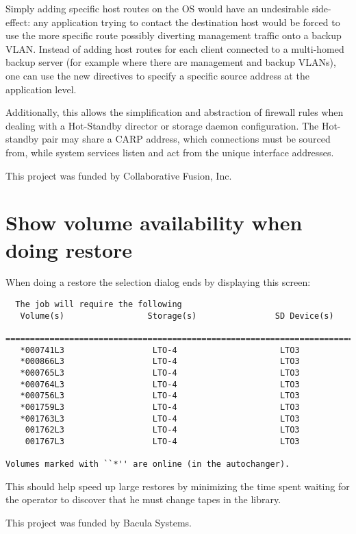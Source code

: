 Simply adding specific host routes on the OS
would have an undesirable side-effect: any
application trying to contact the destination host would be forced to use the
more specific route possibly diverting management traffic onto a backup VLAN.
Instead of adding host routes for each client connected to a multi-homed backup
server (for example where there are management and backup VLANs), one can
use the new directives to specify a specific source address at the application
level.

Additionally, this allows the simplification and abstraction of firewall rules
when dealing with a Hot-Standby director or storage daemon configuration.  The
Hot-standby pair may share a CARP address, which connections must be sourced
from, while system services listen and act from the unique interface addresses.

This project was funded by Collaborative Fusion, Inc.

\section{Show volume availability when doing restore}

When doing a restore the selection dialog ends by displaying this
screen:

\begin{verbatim}
  The job will require the following
   Volume(s)                 Storage(s)                SD Device(s)
   ===========================================================================
   *000741L3                  LTO-4                     LTO3 
   *000866L3                  LTO-4                     LTO3 
   *000765L3                  LTO-4                     LTO3 
   *000764L3                  LTO-4                     LTO3 
   *000756L3                  LTO-4                     LTO3 
   *001759L3                  LTO-4                     LTO3 
   *001763L3                  LTO-4                     LTO3 
    001762L3                  LTO-4                     LTO3 
    001767L3                  LTO-4                     LTO3 

Volumes marked with ``*'' are online (in the autochanger).
\end{verbatim}

This should help speed up large restores by minimizing the time spent
waiting for the operator to discover that he must change tapes in the library.

This project was funded by Bacula Systems.

